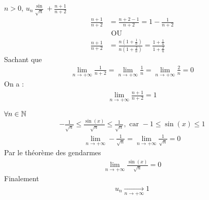 \begin{exercice}
$n > 0$, $u_n \frac{\sin}{\sqrt{n}} + \frac{n+1}{n+2}$
\begin{align*}
    \frac{n+1}{n+2} &= \frac{n + 2 - 1}{n + 2} = 1 - \frac{1}{n+2} \\
                    &\text{ OU } \\
    \frac{n+1}{n+2} &= \frac{n\left( 1 + \frac{1}{n}\right)}{n\left( 1 + \frac{2}{n} \right)} = \frac{1 + \frac{1}{n}}{1 + \frac{2}{n}}
\end{align*}
Sachant que 
\begin{align*}
\lim_{n \to +\infty} \frac{1}{n+2} = \lim_{n \to +\infty} \frac{1}{n} = \lim_{n \to +\infty} \frac{2}{n} =  0
\end{align*}
On a :
\begin{align*}
    \lim_{n \to +\infty} \frac{n+1}{n+2} = 1
\end{align*}

$\forall n \in \mathbb{N}$
\begin{align*}
    -\frac{1}{\sqrt{n}} \leq \frac{\sin(x)}{\sqrt{n}} \leq \frac{1}{\sqrt{n}}, \text{ car } -1 \leq \sin (x) \leq 1
\end{align*}
\begin{align*}
    \lim_{n \to +\infty} -\frac{1}{\sqrt{n}} = \lim_{n \to +\infty} \frac{1}{\sqrt{n}} = 0
\end{align*}
Par le théorème  des gendarmes 
\begin{align*}
    \lim_{n \to +\infty} \frac{\sin(x)}{\sqrt{n}} = 0
\end{align*}
Finalement 
\begin{align*}
    u_n \xrightarrow[n \to +\infty]{} 1
\end{align*}
\end{exercice}

